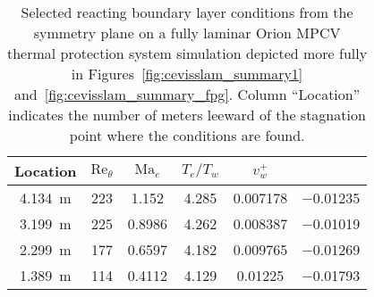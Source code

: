 \begin{table}[p]
\makecommand{\z}{\phantom{0}}  %
\makecommand{\Z}{\phantom{.0}} %
\centering
\caption[%
    Selected locations from the fully laminar Orion MPCV TPS simulation
]{%
    Selected reacting boundary layer conditions from the symmetry plane
    on a fully laminar Orion MPCV thermal protection system simulation
    depicted more fully in Figures~\ref{fig:cevisslam_summary1}
    and~\ref{fig:cevisslam_summary_fpg}.  Column ``Location'' indicates
    the number of meters leeward of the stagnation point where the
    conditions are found.\label{tbl:cevisslam_detail1}
}
\begin{tabular}{cccccc}
Location                              &
$\textrm{Re}_{\theta}$                & %
$\textrm{Ma}_{e}$                     & %
$T_{e}/T_w$                           & %
$v_w^{+}$                             & %
\raisebox{0.10ex}{$p_{e,\xi}^{\ast}$}   %
\\
\toprule\toprule
4.134~m    &  223       &  1.152\z  &  4.285   &  0.007178    &  \num{-0.01235}  \\
3.199~m    &  225       &  0.8986   &  4.262   &  0.008387    &  \num{-0.01019}  \\
2.299~m    &  177       &  0.6597   &  4.182   &  0.009765    &  \num{-0.01269}  \\
1.389~m    &  114       &  0.4112   &  4.129   &  0.01225\z   &  \num{-0.01793}
\end{tabular}
\end{table}


